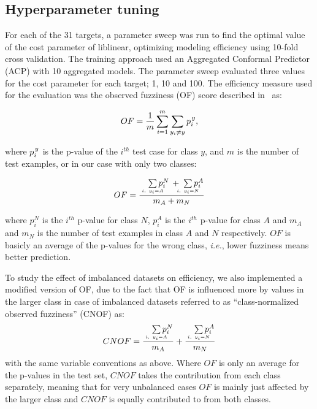 \documentclass[10pt,article]{memoir}
\begin{document}
\subsection{Hyperparameter tuning}
For each of the 31 targets, a parameter sweep was run to find the optimal value of the
cost parameter of liblinear, optimizing modeling efficiency using 10-fold cross validation. The training
approach used an Aggregated Conformal Predictor (ACP) with 10 aggregated models.
The parameter sweep evaluated three values for the cost parameter for each target; 1, 10 and 100. The
efficiency measure used for the evaluation was the observed fuzziness (OF)
score described in~\cite{Vovk2016} as:

\begin{equation}
OF =\frac{ 1}{m} \sum\limits_{i=1}^{m} \sum\limits_{y_i \neq y }  p_i^{\kern1pt y},		
\end{equation}

where $p_i^{\kern1pt y}$ is the p-value of the $i^{th}$ test case for class $y$, and $m$ is the number of test examples, or in our case with only two classes:

\begin{equation}
OF =  \frac
        {\quad\sum\limits_{\mathclap{\substack{\scriptscriptstyle i,\ y_i=A}}}p_i^N \, + \;\sum\limits_{\mathclap{\substack{\scriptscriptstyle i,\ y_i=N}}}p_i^A}
        {m_A + m_N} 
\end{equation}

where $p_i^N$ is the $i^{th}$ p-value for class $N$, $p_i^A$ is the $i^{th}$
p-value for class $A$ and $m_A$ and $m_N$ is the number of test examples in
class $A$ and $N$ respectively. $OF$ is basicly an average of the p-values for
the wrong class, \textit{i.e.}, lower fuzziness means better prediction.

To study the effect of imbalanced datasets on efficiency, we also implemented a
modified version of OF, due to the fact that OF is influenced more
by values in the larger class in case of imbalanced datasets referred to as
``class-normalized
observed fuzziness'' (CNOF) as:
\begin{equation}
CNOF = \frac
        {\quad\sum\limits_{\mathclap{\substack{\scriptscriptstyle i,\ y_i=A}}}p_i^N}
        {m_A}
       + \frac 
        {\quad\sum\limits_{\mathclap{\substack{\scriptscriptstyle i,\ y_i=N}}}p_i^A}
        {m_N} 
\end{equation}
with the same variable conventions as above. Where $OF$ is only an average for
the p-values in the test set, $CNOF$ takes the contribution from each class
separately, meaning that for very unbalanced cases $OF$ is mainly just affected
by the larger class and $CNOF$ is equally contributed to from both classes.
\end{document}
